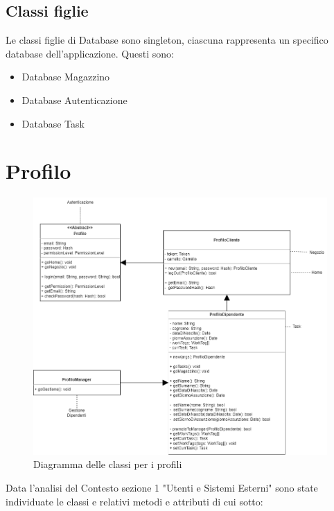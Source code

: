 \documentclass{report}
\begin{document}
\subsection*{Classi figlie}
Le classi figlie di Database sono singleton, ciascuna rappresenta un specifico database dell'applicazione. 
Questi sono: 
\begin{itemize}
	\item Database Magazzino
	\item Database Autenticazione
	\item Database Task
\end{itemize}
\section{Profilo}
\begin{figure}[H]
	\centering\includegraphics[width=1\textwidth]{images/Diagramma_delle_classi_Profilo.png}
	Diagramma delle classi per i profili
\end{figure}
Data l'analisi del Contesto sezione 1 "Utenti e Sistemi Esterni"  sono state individuate le classi e relativi metodi e attributi di cui sotto:
\end{document}
